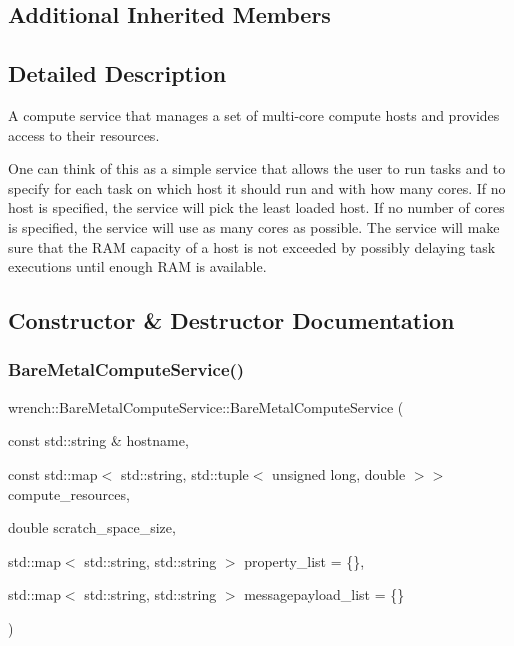 \subsection*{Additional Inherited Members}


\subsection{Detailed Description}
A compute service that manages a set of multi-\/core compute hosts and provides access to their resources. 

One can think of this as a simple service that allows the user to run tasks and to specify for each task on which host it should run and with how many cores. If no host is specified, the service will pick the least loaded host. If no number of cores is specified, the service will use as many cores as possible. The service will make sure that the R\+AM capacity of a host is not exceeded by possibly delaying task executions until enough R\+AM is available. 

\subsection{Constructor \& Destructor Documentation}
\mbox{\label{classwrench_1_1_bare_metal_compute_service_ad1f0b74b15538742ec16da2f805df662}} 
\subsubsection{\texorpdfstring{Bare\+Metal\+Compute\+Service()}{BareMetalComputeService()}\hspace{0.1cm}{\footnotesize\ttfamily [1/2]}}
{\footnotesize\ttfamily wrench\+::\+Bare\+Metal\+Compute\+Service\+::\+Bare\+Metal\+Compute\+Service (\begin{DoxyParamCaption}\item[{const std\+::string \&}]{hostname,  }\item[{const std\+::map$<$ std\+::string, std\+::tuple$<$ unsigned long, double $>$$>$}]{compute\+\_\+resources,  }\item[{double}]{scratch\+\_\+space\+\_\+size,  }\item[{std\+::map$<$ std\+::string, std\+::string $>$}]{property\+\_\+list = {\ttfamily \{\}},  }\item[{std\+::map$<$ std\+::string, std\+::string $>$}]{messagepayload\+\_\+list = {\ttfamily \{\}} }\end{DoxyParamCaption})}



